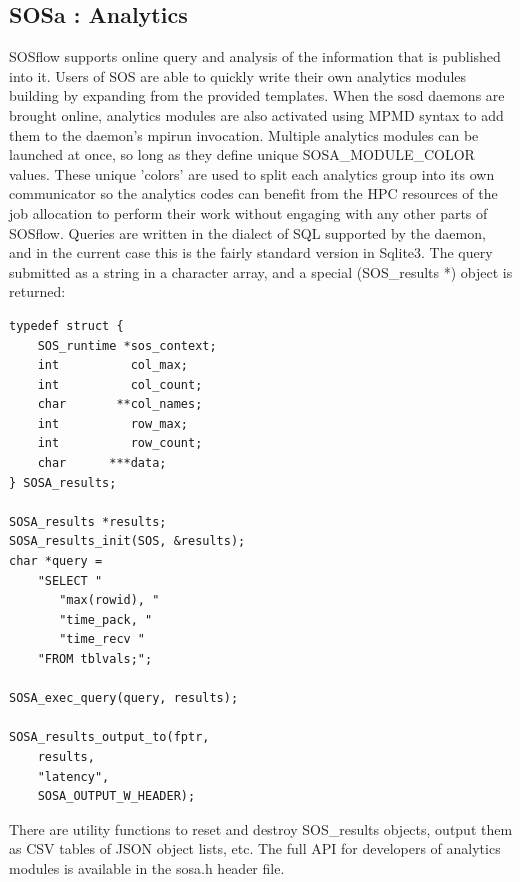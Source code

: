 \subsection{SOSa : Analytics}

SOSflow supports online query and analysis of the information that is
published into it.
%
Users of SOS are able to quickly write their own analytics modules
building by expanding from the provided templates.
%
When the sosd daemons are brought online, analytics modules are also
activated using MPMD syntax to add them to the daemon's mpirun
invocation.
%
Multiple analytics modules can be launched at once, so long as they
define unique SOSA\_MODULE\_COLOR values.
%
These unique 'colors' are used to split each analytics group into its
own communicator so the analytics codes can benefit from the HPC
resources of the job allocation to perform their work without engaging
with any other parts of SOSflow.
%
Queries are written in the dialect of SQL supported by the daemon, and
in the current case this is the fairly standard version in Sqlite3.
%
The query submitted as a string in a character array, and a special
(SOS\_results *) object is returned:

\begin{lstlisting}[frame=single, basicstyle=\small]
typedef struct {
    SOS_runtime *sos_context;
    int          col_max;
    int          col_count;
    char       **col_names;
    int          row_max;
    int          row_count;
    char      ***data;
} SOSA_results;

SOSA_results *results;                                                                                                                       
SOSA_results_init(SOS, &results);
char *query =
    "SELECT "
       "max(rowid), "
       "time_pack, "
       "time_recv "
    "FROM tblvals;";

SOSA_exec_query(query, results);

SOSA_results_output_to(fptr,
    results,
    "latency",
    SOSA_OUTPUT_W_HEADER);
\end{lstlisting}

There are utility functions to reset and destroy SOS\_results objects,
output them as CSV tables of JSON object lists, etc.
%
The full API for developers of analytics modules is available in the
sosa.h header file.

